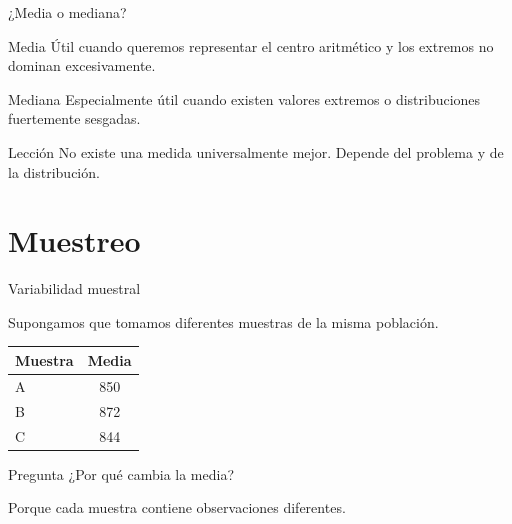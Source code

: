 \documentclass[aspectratio=169,11pt]{beamer}
\begin{document}
\begin{frame}{¿Media o mediana?}

\begin{block}{Media}
Útil cuando queremos representar el centro aritmético y los extremos no dominan excesivamente.
\end{block}

\vspace{0.3cm}

\begin{exampleblock}{Mediana}
Especialmente útil cuando existen valores extremos o distribuciones fuertemente sesgadas.
\end{exampleblock}

\vspace{0.3cm}

\begin{alertblock}{Lección}
No existe una medida universalmente mejor.
Depende del problema y de la distribución.
\end{alertblock}

\end{frame}

\section{Muestreo}

\begin{frame}{Variabilidad muestral}

Supongamos que tomamos diferentes muestras de la misma población.

\begin{center}

\begin{tabular}{lc}
\toprule

Muestra &
Media \\

\midrule

A &
850 \\

B &
872 \\

C &
844 \\

\bottomrule

\end{tabular}

\end{center}

\vspace{0.4cm}

\begin{alertblock}{Pregunta}
¿Por qué cambia la media?
\end{alertblock}

Porque cada muestra contiene observaciones diferentes.

\end{frame}
\end{document}

